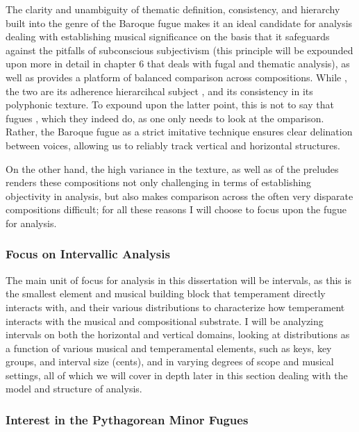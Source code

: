 The clarity and unambiguity of thematic definition, consistency, and
hierarchy built into the genre of the Baroque fugue makes it an ideal
candidate for analysis dealing with establishing musical significance on
the basis that it safeguards against the pitfalls of subconscious
subjectivism (this principle will be expounded upon more in detail in
chapter 6 that deals with fugal and thematic analysis), as well as
provides a platform of balanced comparison across compositions. While ,
the two are its adherence hierarcihcal subject , and its consistency in
its polyphonic texture. To expound upon the latter point, this is not to
say that fugues , which they indeed do, as one only needs to look at the
omparison. Rather, the Baroque fugue as a strict imitative technique
ensures clear delination between voices, allowing us to reliably track
vertical and horizontal structures.

On the other hand, the high variance in the texture, as well as of the
preludes renders these compositions not only challenging in terms of
establishing objectivity in analysis, but also makes comparison across
the often very disparate compositions difficult; for all these reasons I
will choose to focus upon the fugue for analysis.

\subsubsection{Focus on Intervallic
Analysis}\label{focus-on-intervallic-analysis}

The main unit of focus for analysis in this dissertation will be
intervals, as this is the smallest element and musical building block
that temperament directly interacts with, and their various
distributions to characterize how temperament interacts with the musical
and compositional substrate. I will be analyzing intervals on both the
horizontal and vertical domains, looking at distributions as a function
of various musical and temperamental elements, such as keys, key groups,
and interval size (cents), and in varying degrees of scope and musical
settings, all of which we will cover in depth later in this section
dealing with the model and structure of analysis.

\subsubsection{Interest in the Pythagorean Minor
Fugues}\label{interest-in-the-pythagorean-minor-fugues}

